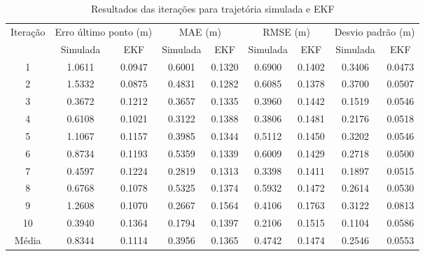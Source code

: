 \begin{table}[H]
\centering
\caption{Resultados das iterações para trajetória simulada e EKF}
\label{tab:metricas}
\begin{tabular}{ccccccccc}
\toprule
Iteração & \multicolumn{2}{c}{Erro último ponto (m)} & \multicolumn{2}{c}{MAE (m)} & \multicolumn{2}{c}{RMSE (m)} & \multicolumn{2}{c}{Desvio padrão (m)} \\
\cmidrule(lr){2-3} \cmidrule(lr){4-5} \cmidrule(lr){6-7} \cmidrule(lr){8-9}
 & Simulada & EKF & Simulada & EKF & Simulada & EKF & Simulada & EKF \\
\midrule
1 & 1.0611 & 0.0947 & 0.6001 & 0.1320 & 0.6900 & 0.1402 & 0.3406 & 0.0473 \\
2 & 1.5332 & 0.0875 & 0.4831 & 0.1282 & 0.6085 & 0.1378 & 0.3700 & 0.0507 \\
3 & 0.3672 & 0.1212 & 0.3657 & 0.1335 & 0.3960 & 0.1442 & 0.1519 & 0.0546 \\
4 & 0.6108 & 0.1021 & 0.3122 & 0.1388 & 0.3806 & 0.1481 & 0.2176 & 0.0518 \\
5 & 1.1067 & 0.1157 & 0.3985 & 0.1344 & 0.5112 & 0.1450 & 0.3202 & 0.0546 \\
6 & 0.8734 & 0.1193 & 0.5359 & 0.1339 & 0.6009 & 0.1429 & 0.2718 & 0.0500 \\
7 & 0.4597 & 0.1224 & 0.2819 & 0.1313 & 0.3398 & 0.1411 & 0.1897 & 0.0515 \\
8 & 0.6768 & 0.1078 & 0.5325 & 0.1374 & 0.5932 & 0.1472 & 0.2614 & 0.0530 \\
9 & 1.2608 & 0.1070 & 0.2667 & 0.1564 & 0.4106 & 0.1763 & 0.3122 & 0.0813 \\
10 & 0.3940 & 0.1364 & 0.1794 & 0.1397 & 0.2106 & 0.1515 & 0.1104 & 0.0586 \\
\midrule
Média & 0.8344 & 0.1114 & 0.3956 & 0.1365 & 0.4742 & 0.1474 & 0.2546 & 0.0553 \\
\bottomrule
\end{tabular}
\end{table}

